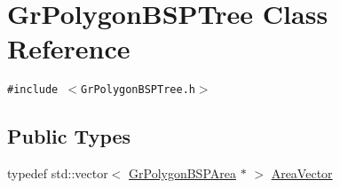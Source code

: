 \hypertarget{class_gr_polygon_b_s_p_tree}{
\section{GrPolygonBSPTree Class Reference}
\label{class_gr_polygon_b_s_p_tree}
}
{\tt \#include $<$GrPolygonBSPTree.h$>$}

\subsection*{Public Types}
\begin{CompactItemize}
\item 
typedef std::vector$<$ \hyperlink{class_gr_polygon_b_s_p_area}{GrPolygonBSPArea} $\ast$ $>$ \hyperlink{class_gr_polygon_b_s_p_tree_d2b320fddca0d87a66ba1e091e9fccb9}{AreaVector}
\end{CompactItemize}
